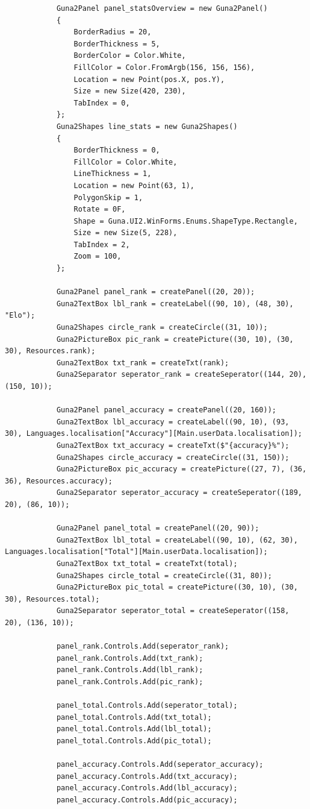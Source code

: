 \documentclass{article}
\begin{document}
\begin{verbatim}
			Guna2Panel panel_statsOverview = new Guna2Panel()
			{
				BorderRadius = 20,
				BorderThickness = 5,
				BorderColor = Color.White,
				FillColor = Color.FromArgb(156, 156, 156),
				Location = new Point(pos.X, pos.Y),
				Size = new Size(420, 230),
				TabIndex = 0,
			};
			Guna2Shapes line_stats = new Guna2Shapes()
			{
				BorderThickness = 0,
				FillColor = Color.White,
				LineThickness = 1,
				Location = new Point(63, 1),
				PolygonSkip = 1,
				Rotate = 0F,
				Shape = Guna.UI2.WinForms.Enums.ShapeType.Rectangle,
				Size = new Size(5, 228),
				TabIndex = 2,
				Zoom = 100,
			};

			Guna2Panel panel_rank = createPanel((20, 20));
			Guna2TextBox lbl_rank = createLabel((90, 10), (48, 30), "Elo");
			Guna2Shapes circle_rank = createCircle((31, 10));
			Guna2PictureBox pic_rank = createPicture((30, 10), (30, 30), Resources.rank);
			Guna2TextBox txt_rank = createTxt(rank);
			Guna2Separator seperator_rank = createSeperator((144, 20), (150, 10));

			Guna2Panel panel_accuracy = createPanel((20, 160));
			Guna2TextBox lbl_accuracy = createLabel((90, 10), (93, 30), Languages.localisation["Accuracy"][Main.userData.localisation]);
			Guna2TextBox txt_accuracy = createTxt($"{accuracy}%");
			Guna2Shapes circle_accuracy = createCircle((31, 150));
			Guna2PictureBox pic_accuracy = createPicture((27, 7), (36, 36), Resources.accuracy);
			Guna2Separator seperator_accuracy = createSeperator((189, 20), (86, 10));

			Guna2Panel panel_total = createPanel((20, 90));
			Guna2TextBox lbl_total = createLabel((90, 10), (62, 30), Languages.localisation["Total"][Main.userData.localisation]);
			Guna2TextBox txt_total = createTxt(total);
			Guna2Shapes circle_total = createCircle((31, 80));
			Guna2PictureBox pic_total = createPicture((30, 10), (30, 30), Resources.total);
			Guna2Separator seperator_total = createSeperator((158, 20), (136, 10));

			panel_rank.Controls.Add(seperator_rank);
			panel_rank.Controls.Add(txt_rank);
			panel_rank.Controls.Add(lbl_rank);
			panel_rank.Controls.Add(pic_rank);

			panel_total.Controls.Add(seperator_total);
			panel_total.Controls.Add(txt_total);
			panel_total.Controls.Add(lbl_total);
			panel_total.Controls.Add(pic_total);

			panel_accuracy.Controls.Add(seperator_accuracy);
			panel_accuracy.Controls.Add(txt_accuracy);
			panel_accuracy.Controls.Add(lbl_accuracy);
			panel_accuracy.Controls.Add(pic_accuracy);


\end{verbatim}
\end{document}
